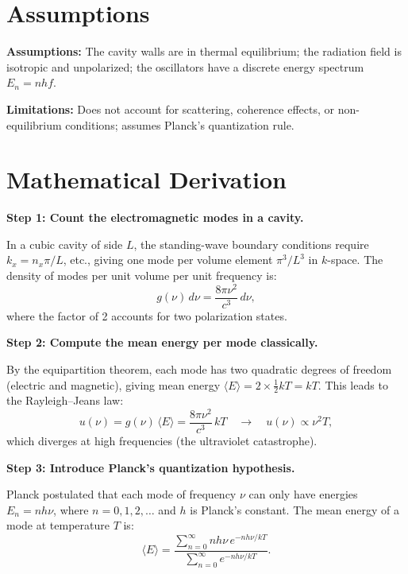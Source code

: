 \section*{Assumptions}

\textbf{Assumptions:} The cavity walls are in thermal equilibrium; the radiation field is isotropic and unpolarized; the oscillators have a discrete energy spectrum $E_{n} = nhf$.


\textbf{Limitations:} Does not account for scattering, coherence effects, or non-equilibrium conditions; assumes Planck's quantization rule.


\section*{Mathematical Derivation}

\textbf{Step 1: Count the electromagnetic modes in a cavity.}

In a cubic cavity of side $L$, the standing-wave boundary conditions require $k_x = n_x\pi/L$, etc., giving one mode per volume element $\pi^{3}/L^{3}$ in $k$-space. The density of modes per unit volume per unit frequency is:
\begin{equation}
g(\nu)\,d\nu = \frac{8\pi\nu^{2}}{c^{3}}\,d\nu,
\end{equation}
where the factor of 2 accounts for two polarization states.

\textbf{Step 2: Compute the mean energy per mode classically.}

By the equipartition theorem, each mode has two quadratic degrees of freedom (electric and magnetic), giving mean energy $\langle E \rangle = 2 \times \frac{1}{2}kT = kT$. This leads to the Rayleigh--Jeans law:
\begin{equation}
u(\nu) = g(\nu)\,\langle E\rangle = \frac{8\pi\nu^{2}}{c^{3}}\,kT \quad\longrightarrow\quad u(\nu) \propto \nu^{2}T,
\end{equation}
which diverges at high frequencies (the ultraviolet catastrophe).

\textbf{Step 3: Introduce Planck's quantization hypothesis.}

Planck postulated that each mode of frequency $\nu$ can only have energies $E_n = nh\nu$, where $n = 0, 1, 2, \ldots$ and $h$ is Planck's constant. The mean energy of a mode at temperature $T$ is:
\begin{equation}
\langle E \rangle = \frac{\sum_{n=0}^{\infty} nh\nu\,e^{-nh\nu/kT}}{\sum_{n=0}^{\infty} e^{-nh\nu/kT}}.
\end{equation}

